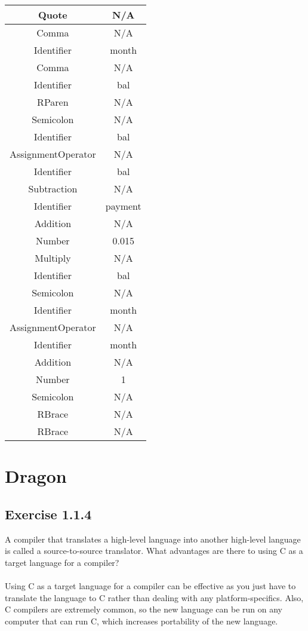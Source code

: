 \documentclass[letterpaper, 10pt, DIV=13]{scrartcl}
\numberwithin{equation}{section}
\numberwithin{figure}{section}
\numberwithin{table}{section}
\begin{document}
\begin{center}
\begin{longtable}{|c|c|}
    \hline
    Quote & N/A \\
    \hline
    Comma & N/A \\
    \hline
    Identifier & month \\
    \hline
    Comma & N/A \\
    \hline
    Identifier & bal \\
    \hline
    RParen & N/A \\
    \hline
    Semicolon & N/A \\
    \hline
    Identifier & bal \\
    \hline
    AssignmentOperator & N/A \\
    \hline
    Identifier & bal \\
    \hline
    Subtraction & N/A \\
    \hline
    Identifier & payment \\
    \hline
    Addition & N/A \\
    \hline
    Number & 0.015 \\
    \hline
    Multiply & N/A \\
    \hline
    Identifier & bal \\
    \hline
    Semicolon & N/A \\
    \hline
    Identifier & month \\
    \hline
    AssignmentOperator & N/A \\
    \hline
    Identifier & month \\
    \hline
    Addition & N/A \\
    \hline
    Number & 1 \\
    \hline
    Semicolon & N/A \\
    \hline
    RBrace & N/A \\
    \hline
    RBrace & N/A \\
    \hline
\end{longtable}
\end{center}

\section{Dragon}
\subsection{Exercise 1.1.4}
A compiler that translates a high-level language into another high-level language is called a source-to-source translator. What advantages are there to using C as a target language for a compiler?
\\\\
Using C as a target language for a compiler can be effective as you just have to translate the language to C rather than dealing with any platform-specifics. Also, C compilers are extremely common, so the new language can be run on any computer that can run C, which increases portability of the new language.
\end{document}
